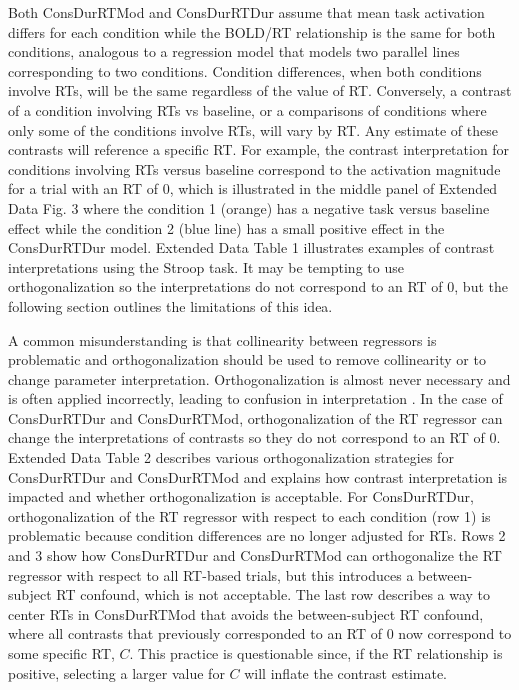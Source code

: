 \documentclass[sn-mathphys,Numbered, super, referee, lineno]{sn-jnl}
\begin{document}
Both ConsDurRTMod and ConsDurRTDur assume that  mean task activation differs for each condition while the BOLD/RT relationship is the same for both conditions, analogous to a regression model that models two parallel lines corresponding to two conditions.  Condition differences, when both conditions involve RTs, will be the same regardless of the value of RT.  Conversely, a contrast of a condition involving RTs vs baseline, or a comparisons of conditions where only some of the conditions involve RTs, will vary by RT.  Any estimate of these contrasts will reference a specific RT.  For example, the contrast interpretation for conditions involving RTs versus baseline correspond to the activation magnitude for a trial with an RT of 0, which is illustrated in the middle panel of Extended Data Fig. 3  where the condition 1 (orange) has a negative task versus baseline effect while the condition 2 (blue line) has a small positive effect in the ConsDurRTDur model.   Extended Data Table 1 illustrates examples of contrast interpretations using the Stroop task.  It may be tempting to use orthogonalization so the interpretations do not correspond to an RT of 0, but the following section outlines the limitations of this idea.




A common misunderstanding is that collinearity between regressors is problematic and orthogonalization should be used to remove collinearity or to change parameter interpretation.  Orthogonalization is almost never necessary and is often applied incorrectly, leading to confusion in interpretation \citep{mumford:poline:poldrack:2015}.  In the case of ConsDurRTDur and ConsDurRTMod, orthogonalization of the RT regressor can change the interpretations of contrasts so they do not correspond to an RT of 0. Extended Data Table 2 describes various orthogonalization strategies for ConsDurRTDur and ConsDurRTMod and explains how contrast interpretation is impacted and whether orthogonalization is acceptable.  For ConsDurRTDur, orthogonalization of the RT regressor with respect to each condition (row 1) is problematic because condition differences are no longer adjusted for RTs.  Rows 2 and 3 show how ConsDurRTDur and ConsDurRTMod can orthogonalize the RT regressor with respect to all RT-based trials, but this introduces a between-subject RT confound, which is not acceptable.  The last row describes a way to center RTs in ConsDurRTMod that avoids the between-subject RT confound, where all contrasts that previously corresponded to an RT of 0 now correspond to some specific RT, $C$.  This practice is questionable since, if the RT relationship is positive, selecting a larger value for $C$ will inflate the contrast estimate.
\end{document}
